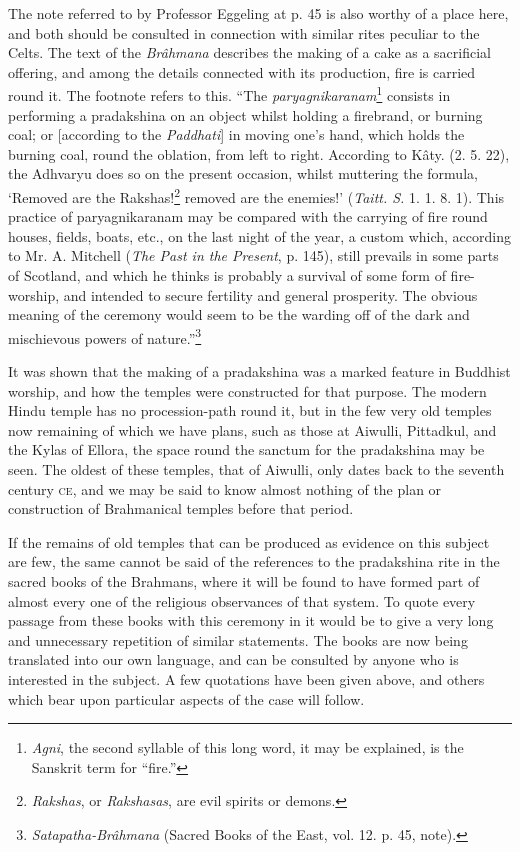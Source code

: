\documentclass[a4paper, 11pt, oneside, polutonikogreek, english]{article}
\begin{document}
The note referred to by Professor Eggeling at p. 45 is also worthy of a place here, and both should be consulted in connection with similar rites peculiar to the Celts. The text of the \emph{Brâhmana} describes the making of a cake as a sacrificial offering, and among the details connected with its production, fire is carried round it. The footnote refers to this. ``The \emph{paryagnikaranam}\footnote{\emph{Agni}, the second syllable of this long word, it may be explained, is the Sanskrit term for ``fire.''} consists in performing a pradakshina on an object whilst holding a firebrand, or burning coal; or [according to the \emph{Paddhati}] in moving one's hand, which holds the burning coal, round the oblation, from left to right. According to Kâty. (2. 5. 22), the Adhvaryu does so on the present occasion, whilst muttering the formula, `Removed are the Rakshas!\footnote{\emph{Rakshas}, or \emph{Rakshasas}, are evil spirits or demons.} removed are the enemies!' (\emph{Taitt. S.} 1. 1. 8. 1). This practice of paryagnikaranam may be compared with the carrying of fire round houses, fields, boats, etc., on the last night of the year, a custom which, according to Mr. A. Mitchell (\emph{The Past in the Present}, p. 145), still prevails in some parts of Scotland, and which he thinks is probably a survival of some form of fire-worship, and intended to secure fertility and general prosperity. The obvious meaning of the ceremony would seem to be the warding off of the dark and mischievous powers of nature.''\footnote{\emph{Satapatha-Brâhmana} (Sacred Books of the East, vol. 12. p. 45, note).}

It was shown that the making of a pradakshina was a marked feature in Buddhist worship, and how the temples were constructed for that purpose. The modern Hindu temple has no procession-path round it, but in the few very old temples now remaining of which we have plans, such as those at Aiwulli, Pittadkul, and the Kylas of Ellora, the space round the sanctum for the pradakshina may be seen. The oldest of these temples, that of Aiwulli, only dates back to the seventh century \textsc{ce}, and we may be said to know almost nothing of the plan or construction of Brahmanical temples before that period.

If the remains of old temples that can be produced as evidence on this subject are few, the same cannot be said of the references to the pradakshina rite in the sacred books of the Brahmans, where it will be found to have formed part of almost every one of the religious observances of that system. To quote every passage from these books with this ceremony in it would be to give a very long and unnecessary repetition of similar statements. The books are now being translated into our own language, and can be consulted by anyone who is interested in the subject. A few quotations have been given above, and others which bear upon particular aspects of the case will follow.
\end{document}
